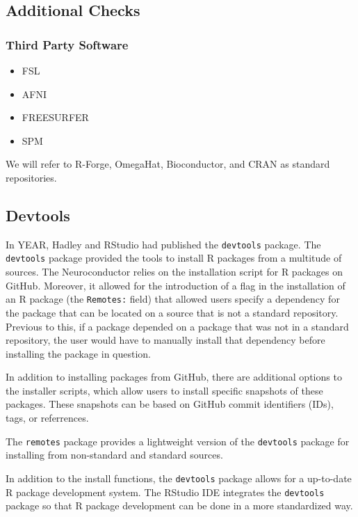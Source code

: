 \documentclass[]{elsarticle} %
\providecommand{\tightlist}{%
  \setlength{\itemsep}{0pt}\setlength{\parskip}{0pt}}
\begin{document}
\subsection{Additional Checks}\label{additional-checks}

\subsubsection{Third Party Software}\label{third-party-software}

\begin{itemize}
\tightlist
\item
  FSL
\item
  AFNI
\item
  FREESURFER
\item
  SPM
\end{itemize}

We will refer to R-Forge, OmegaHat, Bioconductor, and CRAN as standard
repositories.

\subsection{Devtools}\label{devtools}

In YEAR, Hadley and RStudio had published the \texttt{devtools} package.
The \texttt{devtools} package provided the tools to install R packages
from a multitude of sources. The Neuroconductor relies on the
installation script for R packages on GitHub. Moreover, it allowed for
the introduction of a flag in the installation of an R package (the
\texttt{Remotes:} field) that allowed users specify a dependency for the
package that can be located on a source that is not a standard
repository. Previous to this, if a package depended on a package that
was not in a standard repository, the user would have to manually
install that dependency before installing the package in question.

In addition to installing packages from GitHub, there are additional
options to the installer scripts, which allow users to install specific
snapshots of these packages. These snapshots can be based on GitHub
commit identifiers (IDs), tags, or referrences.

The \texttt{remotes} package provides a lightweight version of the
\texttt{devtools} package for installing from non-standard and standard
sources.

In addition to the install functions, the \texttt{devtools} package
allows for a up-to-date R package development system. The RStudio IDE
integrates the \texttt{devtools} package so that R package development
can be done in a more standardized way.
\end{document}

